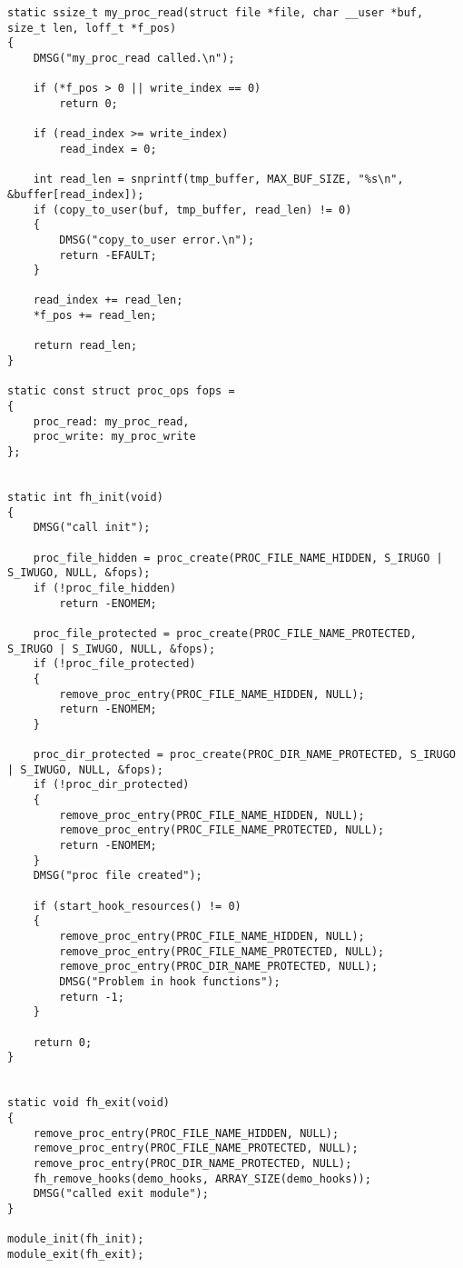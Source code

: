 \begin{lstlisting}[label=code:main,caption=Файл main.c]
static ssize_t my_proc_read(struct file *file, char __user *buf, size_t len, loff_t *f_pos) 
{
    DMSG("my_proc_read called.\n");

    if (*f_pos > 0 || write_index == 0)
        return 0;

    if (read_index >= write_index)
        read_index = 0;

    int read_len = snprintf(tmp_buffer, MAX_BUF_SIZE, "%s\n", &buffer[read_index]);
    if (copy_to_user(buf, tmp_buffer, read_len) != 0)
    {
        DMSG("copy_to_user error.\n");
        return -EFAULT;
    }

    read_index += read_len;
    *f_pos += read_len;

    return read_len;
}

static const struct proc_ops fops =
{
    proc_read: my_proc_read,
    proc_write: my_proc_write
}; 


static int fh_init(void)
{
    DMSG("call init");

	proc_file_hidden = proc_create(PROC_FILE_NAME_HIDDEN, S_IRUGO | S_IWUGO, NULL, &fops);
  	if (!proc_file_hidden) 
        return -ENOMEM;

    proc_file_protected = proc_create(PROC_FILE_NAME_PROTECTED, S_IRUGO | S_IWUGO, NULL, &fops);
    if (!proc_file_protected) 
	{
        remove_proc_entry(PROC_FILE_NAME_HIDDEN, NULL);
        return -ENOMEM;
    }

    proc_dir_protected = proc_create(PROC_DIR_NAME_PROTECTED, S_IRUGO | S_IWUGO, NULL, &fops);
    if (!proc_dir_protected) 
	{
        remove_proc_entry(PROC_FILE_NAME_HIDDEN, NULL);
        remove_proc_entry(PROC_FILE_NAME_PROTECTED, NULL);
        return -ENOMEM;
    }
	DMSG("proc file created");

    if (start_hook_resources() != 0)
    {
        remove_proc_entry(PROC_FILE_NAME_HIDDEN, NULL);
        remove_proc_entry(PROC_FILE_NAME_PROTECTED, NULL);
        remove_proc_entry(PROC_DIR_NAME_PROTECTED, NULL);
        DMSG("Problem in hook functions");
        return -1;
    }

    return 0;
}


static void fh_exit(void)
{
    remove_proc_entry(PROC_FILE_NAME_HIDDEN, NULL);
    remove_proc_entry(PROC_FILE_NAME_PROTECTED, NULL);
    remove_proc_entry(PROC_DIR_NAME_PROTECTED, NULL);
    fh_remove_hooks(demo_hooks, ARRAY_SIZE(demo_hooks));
    DMSG("called exit module");
}

module_init(fh_init);
module_exit(fh_exit);

\end{lstlisting}


